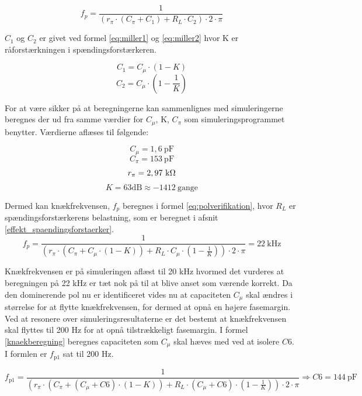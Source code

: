 \begin{equation}
f_p=\frac{1}{(r_\pi \cdot (C_\pi + C_1) + R_L \cdot C_2) \cdot 2 \cdot \pi}
\label{eq:knaekberegning_openloop}
\end{equation}

$C_1$ og $C_2$ er givet ved formel \ref{eq:miller1} og \ref{eq:miller2} hvor K er råforstærkningen i spændingsforstærkeren.

\begin{equation}
C_1=C_\mu \cdot \left( 1-K \right)
\label{eq:miller1}
\end{equation}
\begin{equation}
C_2=C_\mu \cdot \left( 1-\frac{1}{K} \right)
\label{eq:miller2}
\end{equation}

For at være sikker på at beregningerne kan sammenlignes med simuleringerne beregnes der ud fra samme værdier for $C_\mu$, K, $C_\pi$ som simuleringsprogrammet benytter. Værdierne aflæses til følgende: 

\[ C_\mu=1,6~\mathrm{pF} \]
\[ C_\pi=153~\mathrm{pF} \]
\[ r_\pi=2,97~\mathrm{k}\ohm \]
\[ K=63 \mathrm{dB} \approx -1412~\mathrm{gange}\]

Dermed kan knækfrekvensen, $f_p$ beregnes i formel \ref{eq:polverifikation}, hvor $R_L$ er spændingsforstærkerens belastning, som er beregnet i afsnit \ref{effekt_spaendingsforstaerker}.
\begin{equation}
f_p=\frac{1}{(r_\pi \cdot (C_\pi + C_\mu \cdot \left( 1-K \right)) + R_L \cdot C_\mu \cdot \left( 1-\frac{1}{K} \right)) \cdot 2 \cdot \pi}=22~\mathrm{kHz}
\label{eq:polverifikation}
\end{equation}

Knækfrekvensen er på simuleringen aflæst til 20 kHz hvormed det vurderes at beregningen på 22 kHz er tæt nok på til at blive anset som værende korrekt. 
Da den dominerende pol nu er identificeret vides nu at capaciteten $C_\mu$ skal ændres i størrelse for at flytte knækfrekvensen, for dermed at opnå en højere fasemargin. Ved at resonere over simuleringsresultaterne er det bestemt at knækfrekvensen skal flyttes til 200 Hz for at opnå tilstrækkeligt fasemargin. I formel \ref{knaekberegning} beregnes capaciteten som $C_\mu$ skal hæves med ved at isolere $C6$. I formlen er $f_\mathrm{p1}$ sat til 200 Hz. 

\begin{equation}
f_\mathrm{p1}=\frac{1}{(r_\pi \cdot (C_\pi + (C_\mu + C6) \cdot \left( 1-K \right)) + R_L \cdot (C_\mu + C6) \cdot \left( 1-\frac{1}{K} \right)) \cdot 2 \cdot \pi} \Rightarrow C6=144~\mathrm{pF}
\label{knaekberegning}
\end{equation}

